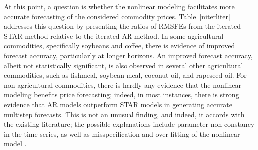 \documentclass[11pt]{article}
\begin{document}
At this point, a question is whether the nonlinear modeling facilitates more accurate forecasting of the considered commodity prices. Table~\ref{niterliter} addresses this question by presenting the ratios of RMSFEs from the iterated STAR method relative to the iterated AR method. In some agricultural commodities, specifically soybeans and coffee, there is evidence of improved forecast accuracy, particularly at longer horizons. An improved forecast accuracy, albeit not statistically significant, is also observed in several other agricultural commodities, such as fishmeal, soybean meal, coconut oil, and rapeseed oil. For non-agricultural commodities, there is hardly any evidence that the nonlinear modeling benefits price forecasting; indeed, in most instances, there is strong evidence that AR models outperform STAR models in generating accurate multistep forecasts. This is not an unusual finding, and indeed, it accords with the existing literature; the possible explanations include parameter non-constancy in the time series, as well as misspecification and over-fitting of the nonlinear model \citep{terasvirta2006}.
\end{document}
